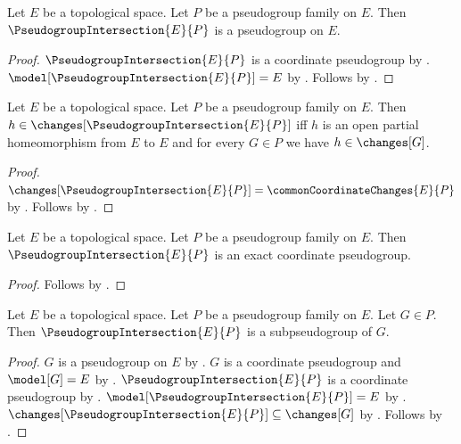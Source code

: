 \begin{classification}\label{pseudogroup_intersection_on}
    Let $E$ be a topological space.
    Let $P$ be a pseudogroup family on $E$.
    Then $\PseudogroupIntersection{E}{P}$ is a pseudogroup on $E$.
\end{classification}
\begin{proof}
    $\PseudogroupIntersection{E}{P}$ is a coordinate pseudogroup by .
    $\model[\PseudogroupIntersection{E}{P}]=E$ by .
    Follows by .
\end{proof}

\begin{theorem}\label{pseudogroup_intersection_changes}
    Let $E$ be a topological space.
    Let $P$ be a pseudogroup family on $E$.
    Then $h\in\changes[\PseudogroupIntersection{E}{P}]$ iff
        $h$ is an open partial homeomorphism from $E$ to $E$ and
        for every $G\in P$ we have $h\in\changes[G]$.
\end{theorem}
\begin{proof}
    $\changes[\PseudogroupIntersection{E}{P}]=\commonCoordinateChanges{E}{P}$ by
        .
    Follows by .
\end{proof}

\begin{theorem}\label{pseudogroup_intersection_is_exact}
    Let $E$ be a topological space.
    Let $P$ be a pseudogroup family on $E$.
    Then $\PseudogroupIntersection{E}{P}$ is an exact coordinate pseudogroup.
\end{theorem}
\begin{proof}
    Follows by .
\end{proof}

\begin{theorem}\label{pseudogroup_intersection_lower_bound}
    Let $E$ be a topological space.
    Let $P$ be a pseudogroup family on $E$.
    Let $G\in P$.
    Then $\PseudogroupIntersection{E}{P}$ is a subpseudogroup of $G$.
\end{theorem}
\begin{proof}
    $G$ is a pseudogroup on $E$ by .
    $G$ is a coordinate pseudogroup and $\model[G]=E$ by .
    $\PseudogroupIntersection{E}{P}$ is a coordinate pseudogroup by
        .
    $\model[\PseudogroupIntersection{E}{P}]=E$ by
        .
    $\changes[\PseudogroupIntersection{E}{P}]\subseteq\changes[G]$ by
        .
    Follows by .
\end{proof}

